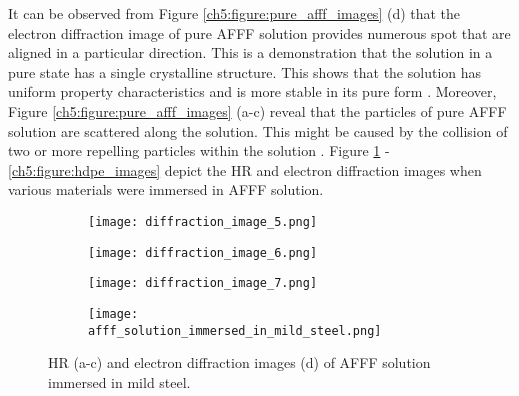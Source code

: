 It can be observed from Figure \ref{ch5:figure:pure_afff_images} (d) that the electron diffraction image of pure AFFF solution provides numerous spot that are aligned in a particular direction. This is a demonstration that the solution in a pure state has a single crystalline structure. This shows that the solution has uniform property characteristics and is more stable in its pure form \cite{coates1996interpretation}.  Moreover, Figure \ref{ch5:figure:pure_afff_images} (a-c) reveal that the particles of pure AFFF solution are scattered along the solution. This might be caused by the collision of two or more repelling particles within the solution \cite{bellamy1980infrared}. Figure \ref{ch5:figure:mild_steel_images} - \ref{ch5:figure:hdpe_images} depict the HR and electron diffraction images when various materials were immersed in AFFF solution. 
  
\begin{figure}[H]
\centering

\begin{subfigure}{.45\textwidth}
    \texttt{[image: diffraction\_image\_5.png]}
\end{subfigure}
\hspace{-1em}
\begin{subfigure}{.45\textwidth}
    \texttt{[image: diffraction\_image\_6.png]}
\end{subfigure}
\par\bigskip
\begin{subfigure}{.45\textwidth}
    \texttt{[image: diffraction\_image\_7.png]}
\end{subfigure}
\hspace{-1em}
\begin{subfigure}{.45\textwidth}
    \texttt{[image: afff\_solution\_immersed\_in\_mild\_steel.png]}
\end{subfigure}

\caption{HR (a-c) and electron diffraction images (d) of AFFF solution immersed in mild steel.}
\label{ch5:figure:mild_steel_images}
\end{figure}

